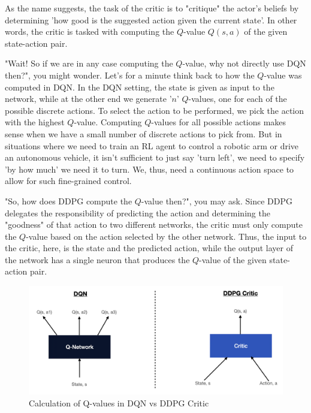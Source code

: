 As the name suggests, the task of the critic is to "critique" the actor's beliefs 
by determining 'how good is the suggested action given the current state'. In other 
words, the critic is tasked with computing the $Q$-value $Q(s,a)$ of the given 
state-action pair.

"Wait! So if we are in any case computing the $Q$-value, why not directly use DQN 
then?", you might wonder. Let's for a minute think back to how the $Q$-value was 
computed in DQN. In the DQN setting, the state is given as input to the network, 
while at the other end we generate '$n$' $Q$-values, one for each of the possible 
discrete actions. To select the action to be performed, we pick the action with 
the highest $Q$-value. Computing $Q$-values for all possible actions makes sense 
when we have a small number of discrete actions to pick from. But in situations 
where we need to train an RL agent to control a robotic arm or drive an autonomous 
vehicle, it isn't sufficient to just say 'turn left', we need to specify 'by how 
much' we need it to turn. We, thus, need a continuous action space to allow for 
such fine-grained control.

"So, how does DDPG compute the $Q$-value then?", you may ask. Since DDPG delegates 
the responsibility of predicting the action and determining the "goodness" of that 
action to two different networks, the critic must only compute the $Q$-value based 
on the action selected by the other network. Thus, the input to the critic, here, 
is the state and the predicted action, while the output layer of the network has a 
single neuron that produces the $Q$-value of the given state-action pair.

\begin{figure}[H]
\centering
\includegraphics[scale=0.5]{pix/td3/ddpg_critic.png}
\caption{Calculation of Q-values in DQN vs DDPG Critic}
\end{figure}

